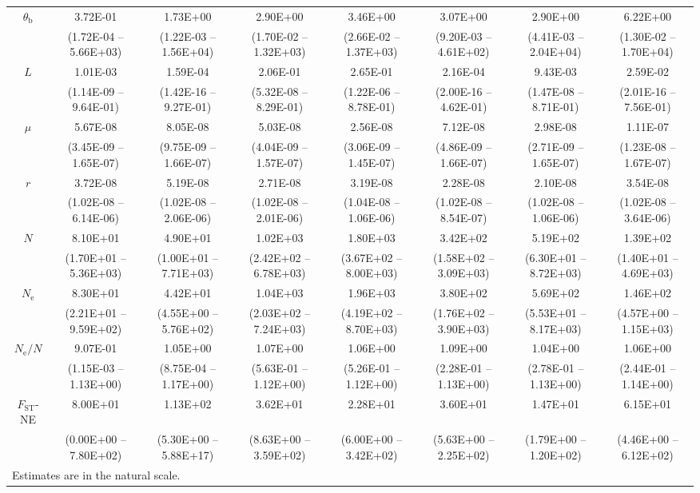 \documentclass[a4paper, 12pt]{article}
\begin{document}
\begin{table}
\begin{tiny}
\begin{tabular}{cccccccc}
        $\theta_{\mathrm{b}}$ & 3.72E-01 & 1.73E+00 & 2.90E+00 & 3.46E+00 & 3.07E+00 & 2.90E+00 & 6.22E+00 \\
         & (1.72E-04 – 5.66E+03) & (1.22E-03 – 1.56E+04) & (1.70E-02 – 1.32E+03) & (2.66E-02 – 1.37E+03) & (9.20E-03 – 4.61E+02) & (4.41E-03 – 2.04E+04) & (1.30E-02 – 1.70E+04) \\
        $L$ & 1.01E-03 & 1.59E-04 & 2.06E-01 & 2.65E-01 & 2.16E-04 & 9.43E-03 & 2.59E-02 \\
         & (1.14E-09 – 9.64E-01) & (1.42E-16 – 9.27E-01) & (5.32E-08 – 8.29E-01) & (1.22E-06 – 8.78E-01) & (2.00E-16 – 4.62E-01) & (1.47E-08 – 8.71E-01) & (2.01E-16 – 7.56E-01) \\
        $\mu$ & 5.67E-08 & 8.05E-08 & 5.03E-08 & 2.56E-08 & 7.12E-08 & 2.98E-08 & 1.11E-07 \\
         & (3.45E-09 – 1.65E-07) & (9.75E-09 – 1.66E-07) & (4.04E-09 – 1.57E-07) & (3.06E-09 – 1.45E-07) & (4.86E-09 – 1.66E-07) & (2.71E-09 – 1.65E-07) & (1.23E-08 – 1.67E-07) \\
        $r$ & 3.72E-08 & 5.19E-08 & 2.71E-08 & 3.19E-08 & 2.28E-08 & 2.10E-08 & 3.54E-08 \\
         & (1.02E-08 – 6.14E-06) & (1.02E-08 – 2.06E-06) & (1.02E-08 – 2.01E-06) & (1.04E-08 – 1.06E-06) & (1.02E-08 – 8.54E-07) & (1.02E-08 – 1.06E-06) & (1.02E-08 – 3.64E-06) \\
        $N$ & 8.10E+01 & 4.90E+01 & 1.02E+03 & 1.80E+03 & 3.42E+02 & 5.19E+02 & 1.39E+02 \\
         & (1.70E+01 – 5.36E+03) & (1.00E+01 – 7.71E+03) & (2.42E+02 – 6.78E+03) & (3.67E+02 – 8.00E+03) & (1.58E+02 – 3.09E+03) & (6.30E+01 – 8.72E+03) & (1.40E+01 – 4.69E+03) \\
        $N_{\mathrm{e}}$ & 8.30E+01 & 4.42E+01 & 1.04E+03 & 1.96E+03 & 3.80E+02 & 5.69E+02 & 1.46E+02 \\
         & (2.21E+01 – 9.59E+02) & (4.55E+00 – 5.76E+02) & (2.03E+02 – 7.24E+03) & (4.19E+02 – 8.70E+03) & (1.76E+02 – 3.90E+03) & (5.53E+01 – 8.17E+03) & (4.57E+00 – 1.15E+03) \\
        $N_{\mathrm{e}}/N$ & 9.07E-01 & 1.05E+00 & 1.07E+00 & 1.06E+00 & 1.09E+00 & 1.04E+00 & 1.06E+00 \\
         & (1.15E-03 – 1.13E+00) & (8.75E-04 – 1.17E+00) & (5.63E-01 – 1.12E+00) & (5.26E-01 – 1.12E+00) & (2.28E-01 – 1.13E+00) & (2.78E-01 – 1.13E+00) & (2.44E-01 – 1.14E+00) \\
         \midrule
        $F_{\mathrm{ST}}$-NE & 8.00E+01 & 1.13E+02 & 3.62E+01 & 2.28E+01 & 3.60E+01 & 1.47E+01 & 6.15E+01 \\
         & (0.00E+00 – 7.80E+02) & (5.30E+00 – 5.88E+17) & (8.63E+00 – 3.59E+02) & (6.00E+00 – 3.42E+02) & (5.63E+00 – 2.25E+02) & (1.79E+00 – 1.20E+02) & (4.46E+00 – 6.12E+02) \\
          \bottomrule
    \multicolumn{8}{l}{\tiny  Estimates are in the natural scale.} \\
    \end{tabular}
\label{tab:supple_bees_posteriors}
\end{tiny}
\end{table}
\end{document}
